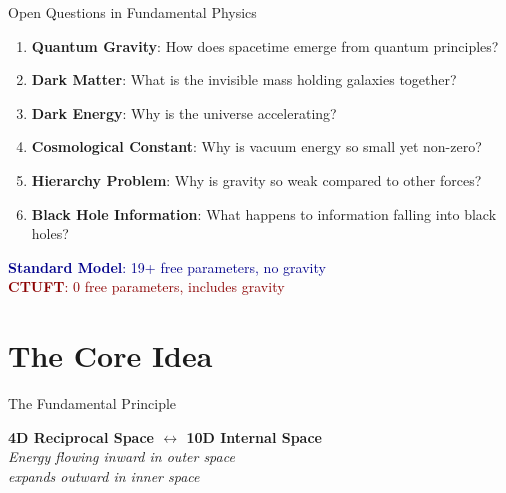 \documentclass[aspectratio=169]{beamer}
\begin{document}
\begin{frame}{Open Questions in Fundamental Physics}
\begin{enumerate}
    \item \textbf{Quantum Gravity}: How does spacetime emerge from quantum principles?
    \item \textbf{Dark Matter}: What is the invisible mass holding galaxies together?
    \item \textbf{Dark Energy}: Why is the universe accelerating?
    \item \textbf{Cosmological Constant}: Why is vacuum energy so small yet non-zero?
    \item \textbf{Hierarchy Problem}: Why is gravity so weak compared to other forces?
    \item \textbf{Black Hole Information}: What happens to information falling into black holes?
\end{enumerate}

\vspace{0.3cm}
\begin{center}
\textcolor{darkblue}{\textbf{Standard Model}: 19+ free parameters, no gravity}\\
\textcolor{darkred}{\textbf{CTUFT}: 0 free parameters, includes gravity}
\end{center}
\end{frame}

\section{The Core Idea}

\begin{frame}{The Fundamental Principle}
\begin{center}
\Large
\textbf{4D Reciprocal Space $\leftrightarrow$ 10D Internal Space}\\[0.5cm]
\normalsize
\textit{Energy flowing inward in outer space}\\
\textit{expands outward in inner space}\\[0.5cm]
\end{center}
\end{frame}
\end{document}
